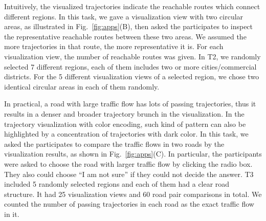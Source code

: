 
Intuitively, the visualized trajectories indicate the reachable routes which connect different regions.
In this task, we gave a visualization view with two circular areas, as illustrated in Fig.~\ref{fig:apps}(B),
then asked the participates to inspect the representative reachable routes between these two areas.
We assumed the more trajectories in that route, the more representative it is.
For each visualization view, the number of reachable routes was given.
In T2, we randomly selected 7 different regions, each of them includes two or more cities/commercial districts.
For the 5 different visualization views of a selected region, we chose two identical circular areas in each of them randomly.


In practical, a road with large traffic flow has lots of passing trajectories, thus it results in a denser and broader trajectory brunch in the visualization.
In the trajectory visualization with color encoding, such kind of pattern can also be highlighted by a concentration of trajectories with {dark} color.
In this task, we asked the participates to compare the traffic flows in two roads by the visualization results, as shown in Fig.~\ref{fig:apps}(C).
In particular, the participants were asked to choose the road with larger traffic flow by clicking the radio box.
They also could choose ``I am not sure'' if they could not decide the answer.
T3 included 5 randomly selected regions and each of them had a clear road structure.
It had 25 visualization views and 60 road pair comparisons in total.
We counted the number of passing trajectories in each road as the exact traffic flow in it.




